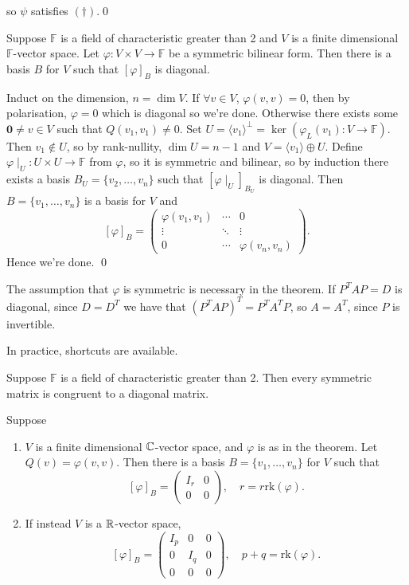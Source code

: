 \documentclass{article}
\newcommand{\F}{\mathbb{F}}
\newcommand{\rk}{\mathrm{rk}}
\begin{document}
so $ \psi $ satisfies $ (\dagger) $.\qed
\begin{theorem}
	Suppose $ \F $ is a field of characteristic greater than 2 and $ V $ is a finite dimensional $ \F $-vector space. Let $ \varphi:V\times V\to \F $ be a symmetric bilinear form. Then there is a basis $ B $ for $ V $ such that $ [\varphi]_B $ is diagonal.
\end{theorem}
\pf Induct on the dimension, $ n = \dim V $. If $ \forall v\in V $, $ \varphi(v,v)=0 $, then by polarisation, $ \varphi=0 $ which is diagonal so we're done. Otherwise there exists some $ \mathbf 0 \ne v \in V $ such that $ Q(v_1,v_1)\ne 0 $. Set $ U=\langle v_1\rangle^\perp=\ker(\varphi_L(v_1):V\to \F) $.
Then $ v_1\notin U $, so by rank-nullity, $ \dim U=n-1 $ and $ V=\langle v_1\rangle\oplus U $. Define $ \varphi\mid_U:U\times U\to \F $ from $ \varphi $, so it is symmetric and bilinear, so by induction there exists a basis $ B_U=\{v_2,\dots, v_n\} $ such that $ [\varphi\mid_U]_{B_U} $ is diagonal. Then $ B=\{v_1,\dots, v_n\} $ is a basis for $ V $ and
\[
	[\varphi]_B=\begin{pmatrix}
		\varphi(v_1,v_1) & \cdots & 0 \\
		\vdots & \ddots & \vdots \\
		0 & \cdots & \varphi(v_n,v_n)
	\end{pmatrix}.
\]
Hence we're done. \qed


\begin{remark}
  The assumption that $ \varphi $ is symmetric is necessary in the theorem. If $ P^TAP=D $ is diagonal, since $ D=D^T $ we have that $ (P^TAP)^T=P^TA^TP $, so $ A=A^T $, since $ P $ is invertible.
\end{remark}
In practice, shortcuts are available.
\begin{corollary}
  Suppose $ \F $ is a field of characteristic greater than 2. Then every symmetric matrix is congruent to a diagonal matrix.
\end{corollary}
\begin{corollary}
  Suppose
  \begin{enumerate}
	  \item $ V $ is a finite dimensional $ \mathbb{C} $-vector space, and $ \varphi $ is as in the theorem. Let $ Q(v)=\varphi(v,v) $. Then there is a basis $ B=\{v_1,\dots, v_n\} $ for $ V $ such that
			  \[
			    [\varphi]_B=\begin{pmatrix}
				    I_r & 0 \\
				    0 & 0
			    \end{pmatrix}, \quad r=r\rk (\varphi).
		    \]
	    \item If instead $ V $ is a $ \mathbb{R} $-vector space, 
		    \[
			    [\varphi]_B=\begin{pmatrix}
				    I_p & 0 & 0 \\
				    0 & I_q & 0 \\
				    0 & 0 & 0
			    \end{pmatrix}, \quad p+q=\rk(\varphi).
		    \]
\end{enumerate}
\end{corollary}
\end{document}
